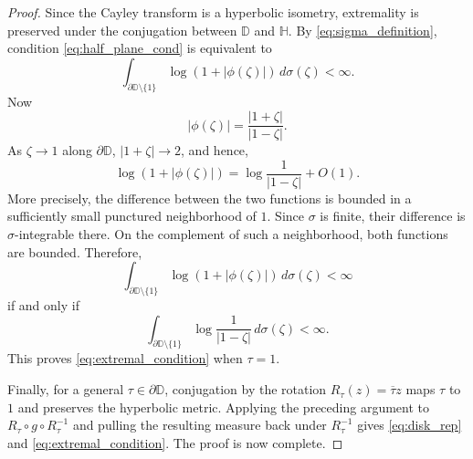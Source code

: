 \documentclass[12pt]{amsart}
\numberwithin{equation}{section}
\theoremstyle{plain}
\theoremstyle{definition}
\begin{document}
\begin{proof}
Since the Cayley transform is a hyperbolic isometry, extremality is
preserved under the conjugation between $\mathbb{D}$ and $\mathbb{H}$.
By \eqref{eq:sigma_definition}, condition \eqref{eq:half_plane_cond}
is equivalent to
\begin{equation*}
\int_{\partial\mathbb{D}\setminus\{1\}}
\log(1+|\phi(\zeta)|)\,d\sigma(\zeta)<\infty.
\end{equation*}
Now
\begin{equation*}
|\phi(\zeta)|
=
\frac{|1+\zeta|}{|1-\zeta|}.
\end{equation*}
As $\zeta\to1$ along $\partial\mathbb{D}$,
$|1+\zeta|\to2$, and hence,
\begin{equation*}
\log(1+|\phi(\zeta)|)
=
\log\frac{1}{|1-\zeta|}+O(1).
\end{equation*}
More precisely, the difference between the two functions is bounded
in a sufficiently small punctured neighborhood of $1$. Since $\sigma$
is finite, their difference is $\sigma$-integrable there. On the
complement of such a neighborhood, both functions are bounded.
Therefore,
\begin{equation*}
\int_{\partial\mathbb{D}\setminus\{1\}}
\log(1+|\phi(\zeta)|)\,d\sigma(\zeta)<\infty
\end{equation*}
if and only if
\begin{equation*}
\int_{\partial\mathbb{D}\setminus\{1\}}
\log\frac{1}{|1-\zeta|}\,d\sigma(\zeta)<\infty.
\end{equation*}
This proves \eqref{eq:extremal_condition} when $\tau=1$.

Finally, for a general $\tau\in\partial\mathbb{D}$, conjugation by the
rotation $R_\tau(z)=\overline{\tau}z$ maps $\tau$ to $1$ and preserves
the hyperbolic metric. Applying the preceding argument to
$R_\tau\circ g\circ R_\tau^{-1}$ and pulling the resulting measure back
under $R_\tau^{-1}$ gives \eqref{eq:disk_rep} and
\eqref{eq:extremal_condition}. The proof is now complete.
\end{proof}



\end{document}
